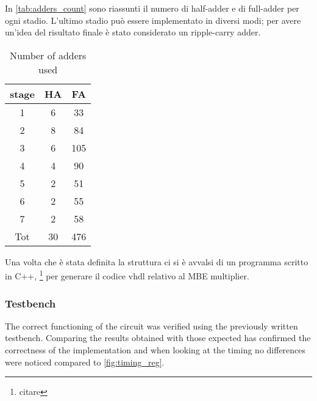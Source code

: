 In \autoref{tab:adders_count} sono riassunti il numero di half-adder e di full-adder per ogni stadio. L'ultimo stadio può essere implementato in diversi modi; per avere un'idea del risultato finale è stato considerato un ripple-carry adder.
\begin{table}[htb!]
	\centering
	\begin{tabular}{ccc}
		stage & HA & FA \\
		\hline
		1 & 6 & 33\\
		2 & 8 & 84\\
		3 & 6 & 105\\
		4 & 4 & 90\\
		5 & 2 & 51\\
		6 & 2 & 55\\
		7 & 2 & 58\\
		Tot & 30 & 476\\
	\end{tabular}
	\label{tab:adders_count}
	\caption{Number of adders used}
\end{table}
Una volta che è stata definita la struttura ci si è avvalsi di un programma scritto in C++, \footnote{citare} per generare il codice vhdl relativo al MBE multiplier.

\subsubsection{Testbench}
The correct functioning of the circuit was verified using the previously written testbench. Comparing the results obtained with those expected has confirmed the correctness of the implementation and when looking at the timing no differences were noticed compared to \autoref{fig:timing_reg}.
